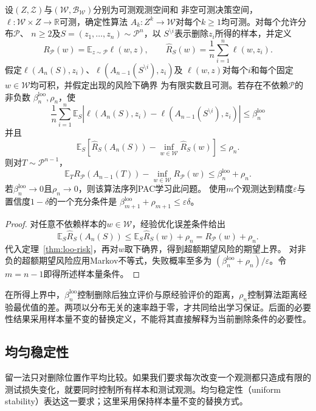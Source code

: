 \begin{theorem}[留一法稳定性与可学习性]
\label{thm:loo-learning}
设$(Z,\mathcal Z)$与$(\mathcal W,\mathcal B_{\mathcal W})$分别为可测观测空间和
非空可测决策空间，$\ell:\mathcal W\times Z\to\mathbb R$可测，确定性算法
$A_k:Z^k\to\mathcal W$对每个$k\geq1$均可测。对每个允许分布$\mathcal P$、
$n\geq2$及$S=(z_1,\ldots,z_n)\sim\mathcal P^n$，以
$S^{\setminus i}$表示删除$z_i$所得的样本，并定义
\[
 R_{\mathcal P}(w)=\mathbb E_{z\sim\mathcal P}\ell(w,z),
 \qquad
 \hat R_S(w)=\frac1n\sum_{i=1}^n\ell(w,z_i).
\]
假定$\ell(A_n(S),z_i)$、$\ell(A_{n-1}(S^{\setminus i}),z_i)$及
$\ell(w,z)$对每个$i$和每个固定$w\in\mathcal W$均可积，并假定出现的风险下确界
为有限实数且可测。若存在不依赖$\mathcal P$的非负数
$\beta_n^{\mathrm{loo}},\rho_n$，使
\[
 \frac1n\sum_{i=1}^n\mathbb E_S
 \left|\ell(A_n(S),z_i)-\ell(A_{n-1}(S^{\setminus i}),z_i)\right|
 \leq\beta_n^{\mathrm{loo}}
\]
并且
\[
 \mathbb E_S\left[\hat R_S(A_n(S))-\inf_{w\in\mathcal W}\hat R_S(w)\right]
 \leq\rho_n.
\]
则对$T\sim\mathcal P^{n-1}$，
\[
 \mathbb E_T R_{\mathcal P}(A_{n-1}(T))-
 \inf_{w\in\mathcal W}R_{\mathcal P}(w)
 \leq\beta_n^{\mathrm{loo}}+\rho_n.
\]
若$\beta_n^{\mathrm{loo}}\to0$且$\rho_n\to0$，则该算法序列PAC学习此问题。
使用$m$个观测达到精度$\varepsilon$与置信度$1-\delta$的一个充分条件是
$\beta_{m+1}^{\mathrm{loo}}+\rho_{m+1}\leq\varepsilon\delta$。
\end{theorem}
\begin{proof}
对任意不依赖样本的$w\in\mathcal W$，经验优化误差条件给出
\[
 \mathbb E_S\hat R_S(A_n(S))
 \leq\mathbb E_S\hat R_S(w)+\rho_n=R_{\mathcal P}(w)+\rho_n.
\]
代入定理~\ref{thm:loo-risk}，再对$w$取下确界，得到超额期望风险的期望上界。
对非负的超额期望风险应用Markov不等式，失败概率至多为
$(\beta_n^{\mathrm{loo}}+\rho_n)/\varepsilon$。令$m=n-1$即得所述样本量条件。
\end{proof}

在所得上界中，$\beta_n^{\mathrm{loo}}$控制删除后独立评价与原经验评价的距离，$\rho_n$控制算法距离经验最优值的差。两项以分布无关的速率趋于零，才共同给出学习保证。后面的必要性结果采用样本量不变的替换定义，不能将其直接解释为当前删除条件的必要性。

\subsection{均匀稳定性}
\label{sec:stability-characterization}

留一法只对删除位置作平均比较。如果我们要求每次改变一个观测都只造成有限的测试损失变化，就要同时控制所有样本和测试观测。均匀稳定性（uniform stability）表达这一要求；这里采用保持样本量不变的替换方式。

